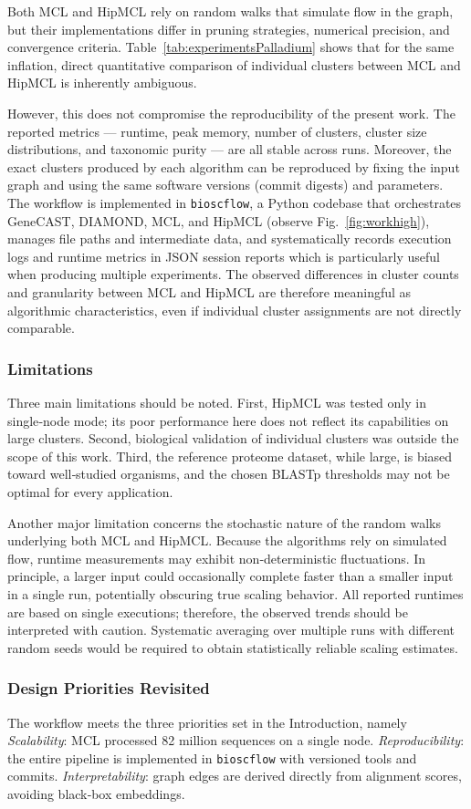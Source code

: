 Both MCL and HipMCL rely on random walks that simulate flow in the graph, but
their implementations differ in pruning strategies, numerical precision, and
convergence criteria. Table~\ref{tab:experimentsPalladium} shows that for the
same inflation, direct quantitative comparison of individual clusters between
MCL and HipMCL is inherently ambiguous.

However, this does not compromise the reproducibility of the present work. The
reported metrics --- runtime, peak memory, number of clusters, cluster size
distributions, and taxonomic purity --- are all stable across runs. Moreover,
the exact clusters produced by each algorithm can be reproduced by fixing the
input graph and using the same software versions (commit digests) and
parameters. The workflow is implemented in \texttt{bioscflow}, a Python
codebase that orchestrates GeneCAST, DIAMOND, MCL, and HipMCL (observe
Fig.~\ref{fig:workhigh}), manages file paths and intermediate data, and
systematically records execution logs and runtime metrics in JSON session
reports which is particularly useful when producing multiple experiments. The
observed differences in cluster counts and granularity between MCL and HipMCL
are therefore meaningful as algorithmic characteristics, even if individual
cluster assignments are not
directly comparable.

\subsubsection*{Limitations}

Three main limitations should be noted. First, HipMCL was tested only in
single‑node mode; its poor performance here does not reflect its capabilities
on large clusters. Second, biological validation of individual clusters was
outside the scope of this work. Third, the reference proteome dataset, while
large, is biased toward well‑studied organisms, and the chosen BLASTp
thresholds may not be optimal for every application.

Another major limitation concerns the stochastic nature of the random walks
underlying both MCL and HipMCL. Because the algorithms rely on simulated flow,
runtime measurements may exhibit non‑deterministic fluctuations. In principle,
a larger input could occasionally complete faster than a smaller input in a
single run, potentially obscuring true scaling behavior. All reported runtimes
are based on single executions; therefore, the observed trends should be
interpreted with caution. Systematic averaging over multiple runs with
different random seeds would be required to obtain statistically reliable scaling
estimates.

\subsubsection*{Design Priorities Revisited}

The workflow meets the three priorities set in the Introduction, namely
\textit{Scalability}: MCL processed 82 million sequences on a single node.
\textit{Reproducibility}: the entire pipeline is implemented in
\texttt{bioscflow} with versioned tools and commits. \textit{Interpretability}:
graph edges are derived directly from alignment scores, avoiding black‑box
embeddings.
